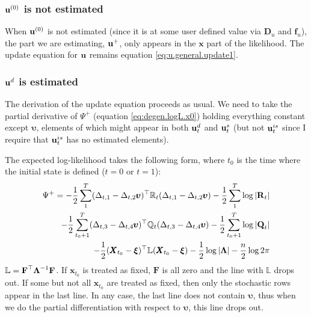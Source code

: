 \documentclass[]{article}
\def\uupsilon{\pmb{\upsilon}}
\def\xixi{\mbox{\boldmath $\xi$}}
\def\LAM{\mbox{\boldmath $\Lambda$}}
\def\LAMm{\mathbb{L}}
\def\DD{\mbox{$\mathbf D$}}	\def\dd{\mbox{$\mathbf d$}}
\def\FF{\mbox{$\mathbf F$}} \def\ff{\mbox{$\mathbf f$}}
\def\QQ{\mbox{$\mathbf Q$}}	 \def\qq{\mbox{$\mathbf q$}} \def\Qb{\mbox{$\mathbf G$}}  \def\Qm{\mathbb{Q}}
\def\RR{\mbox{$\mathbf R$}}	 \def\rr{\mbox{$\mathbf r$}} \def\Rb{\mbox{$\mathbf H$}}	\def\Rm{\mathbb{R}}
\def\XX{\mbox{$\pmb{X}$}}	\def\xx{\mbox{$\pmb{x}$}}
\begin{document}
\subsubsection{$\mbox{$\mathbf u$}^{(0)}$ is not estimated}
When $\mbox{$\mathbf u$}^{(0)}$ is not estimated (since it is at some user defined value via $\DD_u$ and $\ff_u$), the part we are estimating, $\mbox{$\mathbf u$}^+$, only appears in the $\xx$ part of the likelihood. The update equation for $\mbox{$\mathbf u$}$ remains equation \ref{eq:u.general.update1}.

\subsubsection{$\mbox{$\mathbf u$}^d$ is estimated}
The derivation of the update equation proceeds as usual.  We need to take the partial derivative of $\Psi^+$ (equation \ref{eq:degen.logL.x0}) holding everything constant except $\uupsilon$, elements of which might appear in both $\mbox{$\mathbf u$}_t^d$ and $\mbox{$\mathbf u$}_t^s$ (but not $\mbox{$\mathbf u$}_t^{is}$ since I require that $\mbox{$\mathbf u$}_t^{is}$ has no estimated elements). 

The expected log-likelihood takes the following form, where $t_0$ is the time where the initial state is defined ($t=0$ or $t=1$):
\begin{equation}\label{eq:degen.logL.u}
\begin{split}
\Psi^+ =  
-\frac{1}{2}\sum_1^T (\Delta_{t,1} - \Delta_{t,2}\pmb{\upsilon})^\top\Rm_t(\Delta_{t,1} - \Delta_{t,2}\pmb{\upsilon}) - \frac{1}{2}\sum_1^T\log |\RR_t| \\
-\frac{1}{2}\sum_{t_0+1}^T (\Delta_{t,3} - \Delta_{t,4}\pmb{\upsilon})^\top\Qm_t(\Delta_{t,3} - \Delta_{t,4}\pmb{\upsilon}) - \frac{1}{2}\sum_{t_0+1}^T\log |\QQ_t| \\
- \frac{1}{2}(\XX_{t_0} - \xixi)^\top \LAMm(\XX_{t_0} - \xixi) - \frac{1}{2}\log |\LAM| - \frac{n}{2}\log 2\pi \\
\end{split}
\end{equation}
$\LAMm=\FF^\top\LAM^{-1}\FF$.  If $\xx_{t_0}$ is treated as fixed, $\FF$ is all zero and the line with $\LAMm$ drops out.  If some but not all $\xx_{t_0}$ are treated as fixed, then only the stochastic rows appear in the last line.  In any case, the last line does not contain $\uupsilon$, thus when we do the partial differentiation with respect to $\uupsilon$, this line drops out. 
\end{document}

